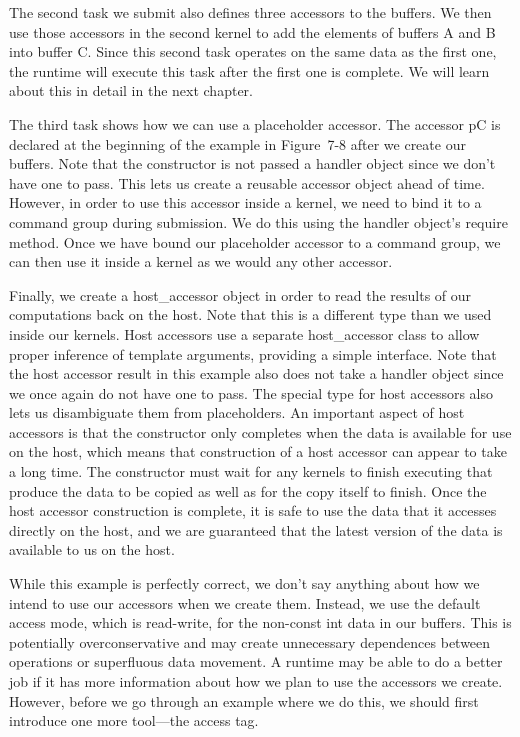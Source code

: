 The second task we submit also defines three accessors to the buffers. We then use those accessors in the second kernel to add the elements of buffers A and B into buffer C. Since this second task operates on the same data as the first one, the runtime will execute this task after the first one is complete. We will learn about this in detail in the next chapter.\par

The third task shows how we can use a placeholder accessor. The accessor pC is declared at the beginning of the example in Figure 7-8 after we create our buffers. Note that the constructor is not passed a handler object since we don’t have one to pass. This lets us create a reusable accessor object ahead of time. However, in order to use this accessor inside a kernel, we need to bind it to a command group during submission. We do this using the handler object’s require method. Once we have bound our placeholder accessor to a command group, we can then use it inside a kernel as we would any other accessor.\par

Finally, we create a host\_accessor object in order to read the results of our computations back on the host. Note that this is a different type than we used inside our kernels. Host accessors use a separate host\_accessor class to allow proper inference of template arguments, providing a simple interface. Note that the host accessor result in this example also does not take a handler object since we once again do not have one to pass. The special type for host accessors also lets us disambiguate them from placeholders. An important aspect of host accessors is that the constructor only completes when the data is available for use on the host, which means that construction of a host accessor can appear to take a long time. The constructor must wait for any kernels to finish executing that produce the data to be copied as well as for the copy itself to finish. Once the host accessor construction is complete, it is safe to use the data that it accesses directly on the host, and we are guaranteed that the latest version of the data is available to us on the host.\par

While this example is perfectly correct, we don’t say anything about how we intend to use our accessors when we create them. Instead, we use the default access mode, which is read-write, for the non-const int data in our buffers. This is potentially overconservative and may create unnecessary dependences between operations or superfluous data movement. A runtime may be able to do a better job if it has more information about how we plan to use the accessors we create. However, before we go through an example where we do this, we should first introduce one more tool—the access tag.\par

